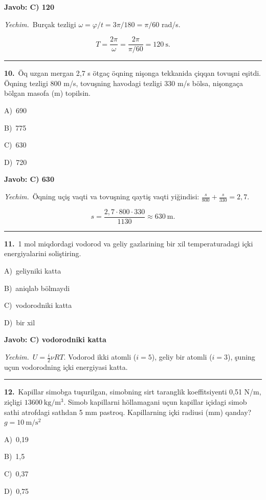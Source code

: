 \documentclass[11pt,a4paper]{article}
\newcommand{\opt}[2]{\hspace*{4mm}#1)\ #2\par}
\begin{document}
\noindent\colorbox{gray!12}{\parbox{\dimexpr\linewidth-2\fboxsep}{\textbf{Javob: C) 120}}}\par\smallskip
\noindent\textit{Yechim.}\ Burçak tezligi $\omega=\varphi/t=3\pi/180=\pi/60$ rad/s.\par
\[T=\frac{2\pi}{\omega}=\frac{2\pi}{\pi/60}=120\ \text{s}.\]\par\medskip\hrule\medskip
{}\noindent\begin{minipage}{\linewidth}
\textbf{10.}\ Öq uzgan mergan 2,7 s ötgaç öqning nişonga tekkanida çiqqan tovuşni eşitdi. Öqning tezligi 800 m/s, tovuşning havodagi tezligi 330 m/s bölsa, nişongaça bölgan masofa (m) topilsin.\par\smallskip
\opt{A}{690}
\opt{B}{775}
\opt{C}{630}
\opt{D}{720}
\end{minipage}\vspace{2pt}\par
\noindent\colorbox{gray!12}{\parbox{\dimexpr\linewidth-2\fboxsep}{\textbf{Javob: C) 630}}}\par\smallskip
\noindent\textit{Yechim.}\ Öqning uçiş vaqti va tovuşning qaytiş vaqti yiğindisi: $\frac{s}{800}+\frac{s}{330}=2{,}7$.\par
\[s=\frac{2{,}7\cdot800\cdot330}{1130}\approx630\ \text{m}.\]\par\medskip\hrule\medskip
{}\noindent\begin{minipage}{\linewidth}
\textbf{11.}\ 1 mol miqdordagi vodorod va geliy gazlarining bir xil temperaturadagi içki energiyalarini soliştiring.\par\smallskip
\opt{A}{geliyniki katta}
\opt{B}{aniqlab bölmaydi}
\opt{C}{vodorodniki katta}
\opt{D}{bir xil}
\end{minipage}\vspace{2pt}\par
\noindent\colorbox{gray!12}{\parbox{\dimexpr\linewidth-2\fboxsep}{\textbf{Javob: C) vodorodniki katta}}}\par\smallskip
\noindent\textit{Yechim.}\ $U=\frac{i}{2}\nu RT$. Vodorod ikki atomli ($i=5$), geliy bir atomli ($i=3$), şuning uçun vodorodning içki energiyasi katta.\par\par\medskip\hrule\medskip
{}\noindent\begin{minipage}{\linewidth}
\textbf{12.}\ Kapillar simobga tuşurilgan, simobning sirt taranglik koeffitsiyenti 0,51 N/m, ziçligi $13600\ \mathrm{kg/m^3}$. Simob kapillarni höllamagani uçun kapillar içidagi simob sathi atrofdagi sathdan 5 mm pastroq. Kapillarning içki radiusi (mm) qanday? $g=10\ \mathrm{m/s^2}$\par\smallskip
\opt{A}{0,19}
\opt{B}{1,5}
\opt{C}{0,37}
\opt{D}{0,75}
\end{minipage}\vspace{2pt}\par
\end{document}
